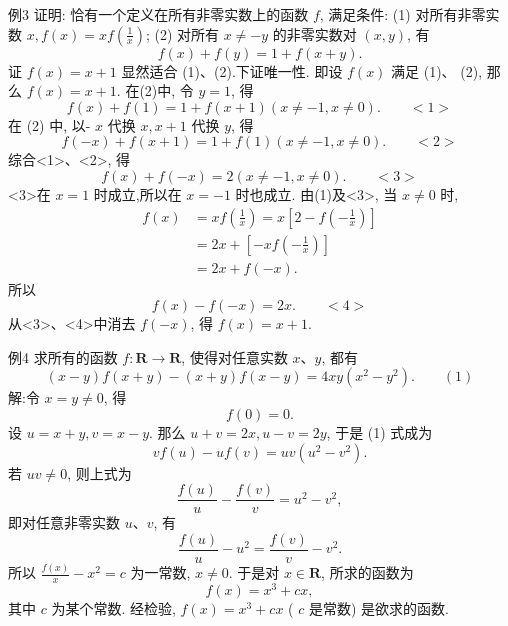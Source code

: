 例3 证明: 恰有一个定义在所有非零实数上的函数 $f$, 满足条件:
(1) 对所有非零实数 $x, f(x)=x f\left(\frac{1}{x}\right)$;
(2) 对所有 $x \neq-y$ 的非零实数对 $(x, y)$, 有
$$
f(x)+f(y)=1+f(x+y) .
$$
证 $f(x)=x+1$ 显然适合 (1)、(2).下证唯一性.
即设 $f(x)$ 满足 (1)、 (2), 那么 $f(x)=x+1$.
在(2)中, 令 $y=1$, 得
$$
f(x)+f(1)=1+f(x+1)(x \neq-1, x \neq 0) . \quad\quad <1>
$$
在 (2) 中, 以- $x$ 代换 $x, x+1$ 代换 $y$, 得
$$
f(-x)+f(x+1)=1+f(1)(x \neq-1, x \neq 0) . \quad\quad <2>
$$
综合<1>、<2>, 得
$$
f(x)+f(-x)=2(x \neq-1, x \neq 0) .  \quad\quad <3>
$$
<3>在 $x=1$ 时成立,所以在 $x=-1$ 时也成立.
由(1)及<3>, 当 $x \neq 0$ 时,
$$
\begin{aligned}
f(x) & =x f\left(\frac{1}{x}\right)=x\left[2-f\left(-\frac{1}{x}\right)\right] \\
& =2 x+\left[-x f\left(-\frac{1}{x}\right)\right] \\
& =2 x+f(-x) .
\end{aligned}
$$
所以
$$
f(x)-f(-x)=2 x .  \quad\quad <4>
$$
从<3>、<4>中消去 $f(-x)$, 得 $f(x)=x+1$.



例4 求所有的函数 $f: \mathbf{R} \rightarrow \mathbf{R}$, 使得对任意实数 $x 、 y$, 都有
$$
(x-y) f(x+y)-(x+y) f(x-y)=4 x y\left(x^2-y^2\right) . \quad\quad (1)
$$
解:令 $x=y \neq 0$, 得
$$
f(0)=0 .
$$
设 $u=x+y, v=x-y$. 那么 $u+v=2 x, u-v=2 y$, 于是 (1) 式成为
$$
v f(u)-u f(v)=u v\left(u^2-v^2\right) .
$$
若 $u v \neq 0$, 则上式为
$$
\frac{f(u)}{u}-\frac{f(v)}{v}=u^2-v^2,
$$
即对任意非零实数 $u 、 v$, 有
$$
\frac{f(u)}{u}-u^2=\frac{f(v)}{v}-v^2 .
$$
所以 $\frac{f(x)}{x}-x^2=c$ 为一常数, $x \neq 0$.
于是对 $x \in \mathbf{R}$, 所求的函数为
$$
f(x)=x^3+c x,
$$
其中 $c$ 为某个常数.
经检验, $f(x)=x^3+c x$ ( $c$ 是常数) 是欲求的函数.



